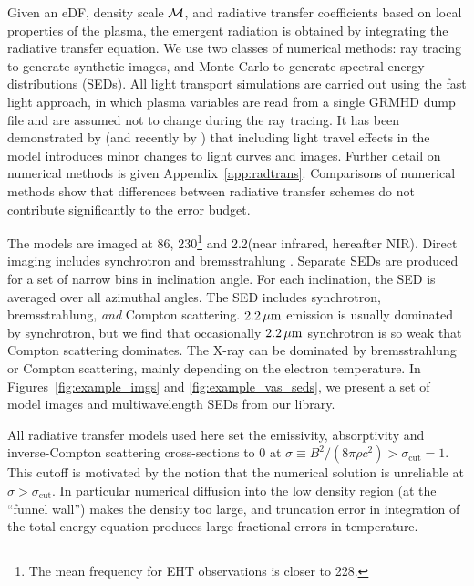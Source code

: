 Given an eDF, density scale $\mathcal{M}$, and radiative transfer coefficients based on local properties of the plasma, the emergent radiation is obtained by integrating the radiative transfer equation.
We use two classes of numerical methods: ray tracing to generate synthetic images, and Monte Carlo to generate spectral energy distributions (SEDs).
All light transport simulations are carried out using the fast light approach, in which plasma variables are read from a single GRMHD dump file and are assumed not to change during the ray tracing. 
It has been demonstrated by \citet{2010ApJ...717.1092D} (and recently by \citealt{2021MNRAS.508.4282M}) that including light travel effects in the model introduces minor changes to light curves and images.  
Further detail on numerical methods is given Appendix~\ref{app:radtrans}.
Comparisons of numerical methods \citep{2020ApJ...897..148G, Prather_et_al_2022} show that differences between radiative transfer schemes do not contribute significantly to the error budget.

The models are imaged at 86\GHz, 230\GHz\footnote{The mean frequency for  EHT observations is closer to 228\GHz.} and 2.2\um (near infrared, hereafter NIR).
Direct imaging includes synchrotron and bremsstrahlung \citep[both ion-electron and electron-electron; see][for a recent review]{2020ApJ...898...50Y}.
Separate SEDs are produced for a set of narrow bins in inclination angle. For each inclination, the SED is averaged over all azimuthal angles.
The SED includes synchrotron, bremsstrahlung, \emph{and} Compton scattering.
$2.2\,\mu\mathrm{m}$ emission is usually dominated by synchrotron, but we find that occasionally $2.2\,\mu\mathrm{m}$ synchrotron is so weak that Compton scattering dominates.
The X-ray can be dominated by bremsstrahlung or Compton scattering, mainly depending on the electron temperature.
In Figures~\ref{fig:example_imgs} and \ref{fig:example_vas_seds}, we present a set of model images and multiwavelength SEDs from our library.

All radiative transfer models used here set the emissivity, absorptivity and inverse-Compton scattering cross-sections to $0$ at $\sigma \equiv B^2/(8\pi\rho c^2) > \sigma_\mathrm{cut} = 1$.  This cutoff is motivated by the notion that the numerical solution is unreliable at $\sigma > \sigma_\mathrm{cut}$.  In particular numerical diffusion into the low density region (at the ``funnel wall'') makes the density too large, and truncation error in integration of the total energy equation produces large fractional errors in temperature.

